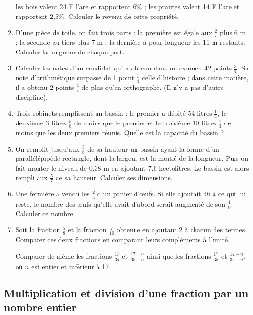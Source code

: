 \documentclass[12 pt]{extarticle}
\theoremstyle{plain}
\begin{document}
\begin{enumerate}
les bois valent 24 F l'are et rapportent 6\% ; 
les prairies valent 14 F l'are et rapportent 2,5\%. 
Calculer le revenu de cette propriété.
\item D'une pièce de toile, on fait trois parts : la première est égale aux $\frac27$ plus 6 m ; la seconde
au tiers plus 7 m ; la dernière a pour longueur les 11 m restants. Calculer la longueur de chaque part. 
\item Calculer les notes d'un candidat qui a obtenu 
dans un examen 42 points $\frac34$. Sa note d'arithmétique surpasse de 1 point $\frac14$ celle d'histoire ; dans cette matière, il a obtenu 2 points $\frac34$ de plus qu'en orthographe. (Il n'y a pas d'autre discipline). 
\item Trois robinets remplissent un bassin : le premier a débité 54 litres $\frac14$, le deuxième 3 litres $\frac58$ de moins que le premier et le troisième 10 litres $\frac13$ de moins que les deux premiers réunis. Quelle est la capacité du bassin ? 
\item On remplit jusqu'aux $\frac38$ de sa hauteur un bassin ayant la forme d'un parallélépipède rectangle, dont la largeur est la moitié de la longueur. Puis on fait monter le niveau de 0,38 m en ajoutant 7,6 hectolitres. Le bassin est alors rempli aux $\frac57$ de sa hauteur. Calculer ses dimensions. 
\item Une fermière a vendu les $\frac25$ d'un panier d'œufs. Si elle ajoutait 46 à ce qui lui reste, le nombre des œufs qu'elle avait d'abord serait augmenté de son $\frac19$. Calculer ce nombre.
\item Soit la fraction $\frac58$ et la fraction $\frac7{10}$ obtenue en ajoutant 2 à chacun des termes. Comparer ces deux fractions en comparant leurs 
compléments à l'unité. 

Comparer de même les fractions $\frac{17}{35}$ et $\frac{17+n}{35+n}$ ainsi que les fractions $\frac{17}{35}$ et $\frac{17-n}{35-n}$, où $n$ est entier et inférieur à 17. 

\end{enumerate}

\subsection{Multiplication et division d'une fraction par un nombre entier}
 
\end{document}
